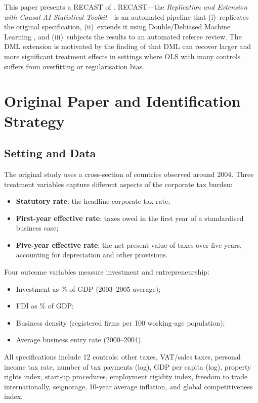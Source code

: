 \documentclass[12pt]{article}
\begin{document}
This paper presents a RECAST of \citet{djankov2010}. RECAST---the
\textit{Replication and Extension with Causal AI Statistical Toolkit}---is an
automated pipeline that (i)~replicates the original specification, (ii)~extends it
using Double/Debiased Machine Learning \citep{chernozhukov2018}, and (iii)~subjects
the results to an automated referee review. The DML extension is motivated by the
finding of \citet{baiardi2024} that DML can recover larger and more significant
treatment effects in settings where OLS with many controls suffers from overfitting
or regularisation bias.

\section{Original Paper and Identification Strategy}

\subsection{Setting and Data}

The original study uses a cross-section of countries observed around 2004. Three
treatment variables capture different aspects of the corporate tax burden:
\begin{itemize}
  \item \textbf{Statutory rate}: the headline corporate tax rate;
  \item \textbf{First-year effective rate}: taxes owed in the first year of a
        standardised business case;
  \item \textbf{Five-year effective rate}: the net present value of taxes over five
        years, accounting for depreciation and other provisions.
\end{itemize}
Four outcome variables measure investment and entrepreneurship:
\begin{itemize}
  \item Investment as \% of GDP (2003--2005 average);
  \item FDI as \% of GDP;
  \item Business density (registered firms per 100 working-age population);
  \item Average business entry rate (2000--2004).
\end{itemize}
All specifications include 12 controls: other taxes, VAT/sales taxes, personal
income tax rate, number of tax payments (log), GDP per capita (log), property
rights index, start-up procedures, employment rigidity index, freedom to trade
internationally, seignorage, 10-year average inflation, and global competitiveness
index.
\end{document}
